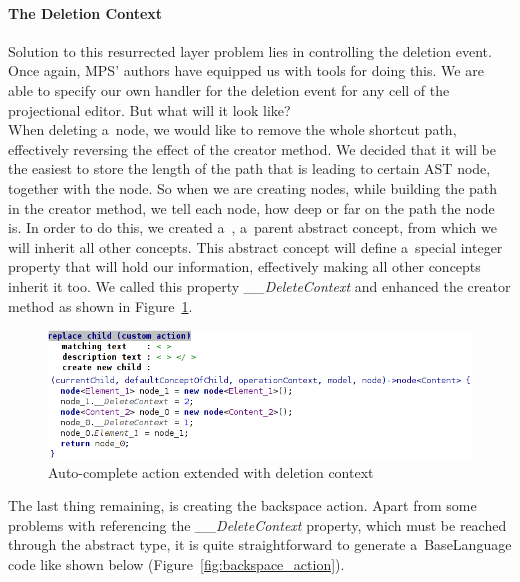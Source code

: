 \paragraph {The Deletion Context}

Solution to this resurrected layer problem lies in controlling the deletion event.
Once again, MPS' authors have equipped us with tools for doing this.
We are able to specify our own handler for the deletion event for any cell of the projectional editor.
But what will it look like?
\\

When deleting a~node, we would like to remove the whole shortcut path, effectively reversing the effect of the creator method.
We decided that it will be the easiest to store the length of the path that is leading to certain AST node, together with the node.
So when we are creating nodes, while building the path in the creator method, we tell each node, how deep or far on the path the node is.
In order to do this, we created a~, a~parent abstract concept, from which we will inherit all other concepts.
This abstract concept will define a~special integer property that will hold our information, effectively making all other concepts inherit it too.
We called this property \textit{{\_}{\_}DeleteContext} and enhanced the creator method as shown in Figure~\ref{fig:autocomplete_action_delete_context}.

\begin{figure}[ht]
	\centering
	\includegraphics[width=\textwidth]{./img/autocomplete_action_delete_context.png}
	\caption{Auto-complete action extended with deletion context}
	\label{fig:autocomplete_action_delete_context}
\end{figure}

The last thing remaining, is creating the backspace action.
Apart from some problems with referencing the \textit{{\_}{\_}DeleteContext} property, which must be reached through the abstract  type, it is quite straightforward to generate a~BaseLanguage code like shown below (Figure~\ref{fig:backspace_action}).

